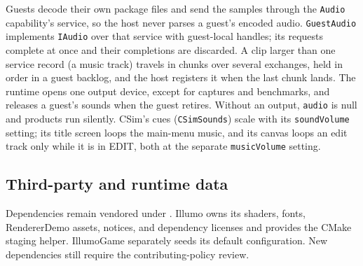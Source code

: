 Guests decode their own package files and send the samples through the
\texttt{Audio} capability's service, so the host never parses a guest's
encoded audio. \texttt{GuestAudio} implements \texttt{IAudio} over that
service with guest-local handles; its requests complete at once and their
completions are discarded. A clip larger than one service record (a music
track) travels in chunks over several exchanges, held in order in a guest
backlog, and the host registers it when the last chunk lands. The runtime
opens one output device, except for captures and benchmarks, and releases a
guest's sounds when the guest retires. Without an output, \texttt{audio} is
null and products run silently. CSim's cues (\texttt{CSimSounds}) scale with
its \texttt{soundVolume} setting; its title screen loops the main-menu
music, and its canvas loops an edit track only while it is in EDIT, both at
the separate \texttt{musicVolume} setting.

\subsection{Third-party and runtime data}
Dependencies remain vendored under . Illumo owns
its shaders, fonts, RendererDemo assets, notices, and dependency licenses and
provides the CMake staging helper. IllumoGame separately seeds its default
configuration. New dependencies still require the contributing-policy review.
